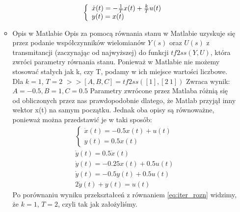 \documentclass[a4paper,10pt]{article}
\begin{document}
\begin{itemize}
\begin{itemize}
\begin{eqnarray}
		\left\{ \begin{array}{l}
			\dot{x}(t) = -{1 \over T}x(t) + {k \over T}u(t)\\
			y(t) = x(t)
		\end{array} \right.
	\end{eqnarray}
\item Opis w Matlabie
\newline Opis za pomocą równania stanu w Matlabie uzyskuje się przez podanie współczynników wielomianów $Y(s)$ oraz $U(s)$ z transmitancji (zaczynając od najwyższej) do funkcji $tf2ss(Y, U)$, która zwróci parametry równania stanu.
Ponieważ w Matlabie nie możemy stosować stałych jak k, czy T, podamy w ich miejsce wartości liczbowe.
\newline\newline Dla $k=1$, $T=2$
\newline $>>[A,B,C] = tf2ss([1], [2 \ 1])$
\newline Zwraca wynik:
$A = -0.5, B = 1, C = 0.5$
\newline \newline Parametry zwrócone przez Matlaba różnią się od obliczonych przez nas prawdopodobnie dlatego, że Matlab przyjął inny wektor x(t) na samym początku. Jednak oba opisy są równoważne, ponieważ można przedstawić je w taki sposób:
		\begin{eqnarray}
		\nonumber \left\{ \begin{array}{l}
			\dot{x}(t) = -0.5x(t) + u(t)\\
			y(t) = 0.5x(t)
		\end{array} \right.\\
		\nonumber \dot{y}(t) = 0.5\dot{x}(t)\\
		\nonumber \dot{y}(t) = -0.25x(t) + 0.5u(t)\\
		\nonumber \dot{y}(t) = -0.5y(t) + 0.5u(t)\\
		2\dot{y}(t) + y(t) = u(t)
	\end{eqnarray}
Po porównaniu wyniku przekształceń z równaniem \ref{eq:iter_rozn} widzimy, że $k=1$, $T=2$, czyli tak jak założyliśmy.

\end{itemize}


\end{itemize}
\end{document}
